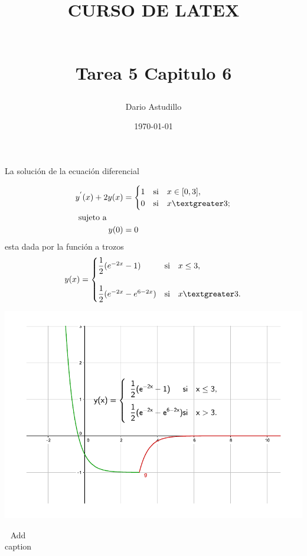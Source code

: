 \documentclass[11pt, a4paper]{article} %
\title{\begin{large}CURSO DE LATEX\end{large}\\ Tarea 5 Capitulo 6}
\author{Dario Astudillo}
\date{\today}
\begin{document}
	\maketitle
La solución de la ecuación diferencial
 
	\begin{align*}
	  y^{'}(x)+2y(x)&= \begin{cases}
	1&  \text{si} \quad x \in [0,3], 
	\\
	0& \text{si} \quad x \textgreater 3 ;     \\	 	
	\end{cases}
	\\ \text{sujeto a}\quad \quad &\\
	 y(0)&=0\\
	\end{align*}
esta dada por la función a trozos 
	\[
	 y(x) = \begin{cases}
	\dfrac{1}{2}(e^{-2x}-1)&  \text{si} \quad x \leq 3,
\\
	 \\    
    \dfrac{1}{2}(e^{-2x}-e^{6-2x})& \text{si}\quad x   \textgreater 3.
	 \\	 	
	\end{cases}
     \]
\begin{center}
\includegraphics[scale=0.9]{geo1.pdf}
\end{center}
\begin{table}[htbp]
  \centering
  \caption{Add caption}
    \begin{tabular}{r}
     \\
    \end{tabular}%
  \label{tab:addlabel}%
\end{table}%
\end{document}
